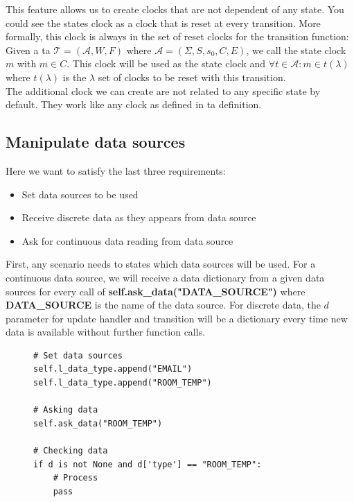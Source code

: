 \documentclass[12pt]{article}
\theoremstyle{definition}
\theoremstyle{definition}
\theoremstyle{remark}
\newcommand{\A}{\mathcal{A}}
\begin{document}
This feature allows us to create clocks that are not dependent of any state. You could see the states clock as a clock that is reset at every transition. More formally, this clock is always in the set of reset clocks for the transition function: Given a \gls{ta} $\mathcal{T} = (\A, W, F)$ where $\A = (\Sigma, S, s_{0},C, E)$, we call the state clock $m$ with $m \in C$. This clock will be used as the state clock and $\forall t \in \A: m \in t(\lambda)$ where $t(\lambda)$ is the $\lambda$ set of clocks to be reset with this transition.\\

The additional clock we can create are not related to any specific state by default. They work like any clock as defined in \gls{ta} definition.


\subsection{Manipulate data sources}

Here we want to satisfy the last three requirements:
\begin{itemize}
\item Set data sources to be used
\item Receive discrete data as they appears from data source
\item Ask for continuous data reading from data source
\end{itemize}

First, any scenario needs to states which data sources will be used. For a continuous data source, we will receive a data dictionary from a given data sources for every call of \textbf{self.ask\_data("DATA\_SOURCE")} where \textbf{DATA\_SOURCE} is the name of the data source. For discrete data, the $d$ parameter for update handler and transition will be a dictionary every time new data is available without further function calls.

\begin{figure}[H]
    \begin{lstlisting}[caption="Set data source",label={lst:python-data-sources}]
# Set data sources
self.l_data_type.append("EMAIL")
self.l_data_type.append("ROOM_TEMP")

# Asking data
self.ask_data("ROOM_TEMP")

# Checking data
if d is not None and d['type'] == "ROOM_TEMP":
    # Process
    pass
    \end{lstlisting}
\end{figure}
\end{document}
